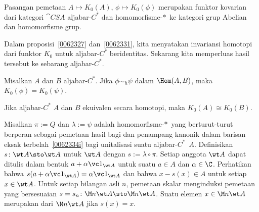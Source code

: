 \begin{prop}\label{0062511} Pasangan pemetaan $A \mapsto K_0(A)$, $\phi \mapsto K_0(\phi)$ merupakan
funktor kovarian dari kategori $\cat{CSA}$ aljabar-$C^*$ dan homomorfisme-$*\,$ ke
kategori grup Abelian dan homomorfisme grup.
\end{prop}

Dalam proposisi~\ref{0062327} dan~\ref{0062331}, kita menyatakan invariansi homotopi dari
funktor $K_0$ untuk aljabar-$C^*$ beridentitas. Sekarang kita memperluas hasil tersebut ke sebarang
aljabar-$C^*$.

\begin{prop}\label{0062521} Misalkan $A$ dan $B$ aljabar-$C^*$. Jika $\phi \sim_h \psi$
dalam $\Hom(A,B)$, maka $K_0(\phi) = K_0(\psi)$.
\end{prop}


\begin{prop}\label{0062524} Jika aljabar-$C^*$ $A$ dan $B$ ekuivalen secara homotopi,
maka $K_0(A) \cong K_0(B)$.
\end{prop}


\begin{defn} Misalkan $\pi:=Q$ dan $\lambda:=\psi$ adalah homomorfisme-$*\,$ yang berturut-turut berperan sebagai pemetaan hasil bagi dan penampang kanonik dalam barisan eksak
terbelah~\eqref{0062334i} bagi unitalisasi suatu aljabar-$C^*$~$A$. Definisikan %
 $s\colon \wt A \sto \wt A$ untuk $\wt A$ dengan $s :=  \lambda \circ \pi$. Setiap
anggota $\wt A$ dapat ditulis dalam bentuk $a + \alpha \vc 1_{\wt A}$ untuk suatu $a \in A$ dan
$\alpha \in \C$. Perhatikan bahwa $s(a + \alpha \vc 1_{\wt A}) = \alpha \vc 1_{\wt A}$ dan bahwa $x
- s(x) \in A$ untuk setiap $x \in \wt A$. Untuk setiap bilangan asli $n$, pemetaan skalar menginduksi
pemetaan yang bersesuaian $s = s_n\colon \M n{\wt A} \sto \M n{\wt A}$. Suatu elemen $x \in \M n{\wt
A}$ merupakan
 dari $\M n{\wt A}$ jika $s(x) = x$.
\end{defn}

